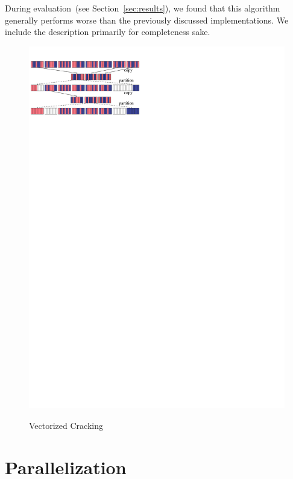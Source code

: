 During evaluation~(see Section~\ref{sec:results}), we found that this
algorithm generally performs worse than the previously discussed
implementations. We include the description primarily for completeness
sake.
\begin{figure}[!t]
\begin{center}
\includegraphics[trim=0cm 24.5cm 0cm 1cm,width=2.3\columnwidth]{Figures/damon/vectorized}
\vspace{0ex}
\caption{Vectorized Cracking}
\vspace{-2.5ex}
\label{fig:vectorized-cracking}
\end{center}
\end{figure}

\section{Parallelization}
\label{subsec:tlp}

